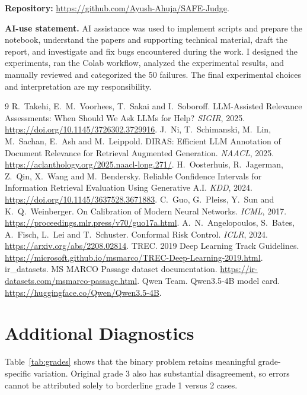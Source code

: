 \documentclass[11pt,a4paper]{article}
\begin{document}
\textbf{Repository:} \url{https://github.com/Ayush-Ahuja/SAFE-Judge}.

\begin{samepage}
\textbf{AI-use statement.} AI assistance was used to implement scripts and prepare the
notebook, understand the papers and supporting technical material, draft the report, and investigate and fix bugs encountered during the work.
I designed the experiments, ran the Colab workflow,
analyzed the experimental results, and manually reviewed and categorized the 50
failures. The final experimental choices and interpretation
are my responsibility.

\end{samepage}

\small
\begin{thebibliography}{9}\setlength{\itemsep}{4pt}
 R.~Takehi, E.~M.~Voorhees, T.~Sakai and I.~Soboroff.
LLM-Assisted Relevance Assessments: When Should We Ask LLMs for Help?
\emph{SIGIR}, 2025. \url{https://doi.org/10.1145/3726302.3729916}.
 J.~Ni, T.~Schimanski, M.~Lin, M.~Sachan, E.~Ash and M.~Leippold.
DIRAS: Efficient LLM Annotation of Document Relevance for Retrieval Augmented Generation.
\emph{NAACL}, 2025. \url{https://aclanthology.org/2025.naacl-long.271/}.
 H.~Oosterhuis, R.~Jagerman, Z.~Qin, X.~Wang and M.~Bendersky.
Reliable Confidence Intervals for Information Retrieval Evaluation Using Generative A.I.
\emph{KDD}, 2024. \url{https://doi.org/10.1145/3637528.3671883}.
 C.~Guo, G.~Pleiss, Y.~Sun and K.~Q.~Weinberger.
On Calibration of Modern Neural Networks. \emph{ICML}, 2017.
\url{https://proceedings.mlr.press/v70/guo17a.html}.
 A.~N.~Angelopoulos, S.~Bates, A.~Fisch, L.~Lei and T.~Schuster.
Conformal Risk Control. \emph{ICLR}, 2024.
\url{https://arxiv.org/abs/2208.02814}.
 TREC. 2019 Deep Learning Track Guidelines.
\url{https://microsoft.github.io/msmarco/TREC-Deep-Learning-2019.html}.
 ir\_datasets. MS MARCO Passage dataset documentation.
\url{https://ir-datasets.com/msmarco-passage.html}.
 Qwen Team. Qwen3.5-4B model card.
\url{https://huggingface.co/Qwen/Qwen3.5-4B}.
\end{thebibliography}
\normalsize

\appendix
\setlength{\intextsep}{6pt}
\captionsetup[figure]{skip=5pt}
\section{Additional Diagnostics}
Table~\ref{tab:grades} shows that the binary problem retains meaningful grade-specific
variation. Original grade 3 also has substantial disagreement, so errors cannot be
attributed solely to borderline grade 1 versus 2 cases.
\end{document}
